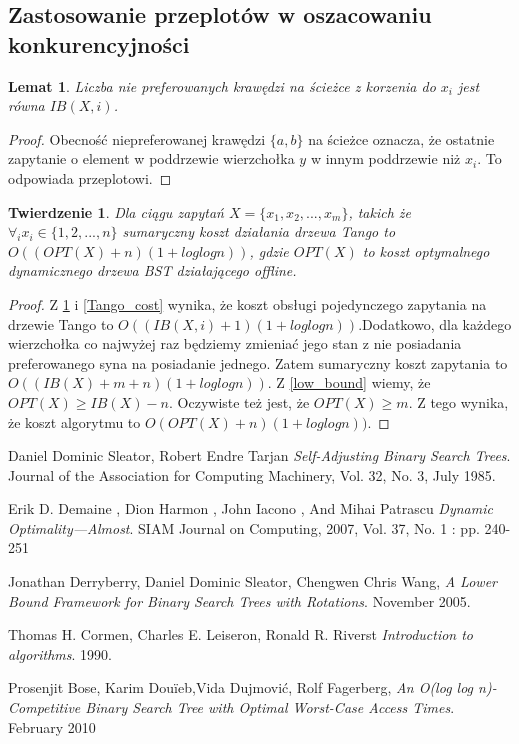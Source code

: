 \documentclass[declaration,shortabstract]{iithesis}
\theoremstyle{remark}
\theoremstyle{plain}
\newtheorem{theorem}[definition]{Twierdzenie}
\theoremstyle{plain}
\theoremstyle{plain}
\newtheorem{lemma}[definition]{Lemat}
\begin{document}
\subsection{Zastosowanie przeplotów w oszacowaniu konkurencyjności}
\begin{lemma}\label{num_switch}
Liczba nie preferowanych krawędzi na ścieżce z korzenia do \(x_i\) jest równa \(IB(X, i)\).
\end{lemma}
\begin{proof}
Obecność niepreferowanej krawędzi \( \{a, b\}\) na ścieżce oznacza, że ostatnie zapytanie o element w poddrzewie wierzchołka $y$ w innym poddrzewie niż \(x_i\). To odpowiada przeplotowi.
\end{proof}

\begin{theorem}
Dla ciągu zapytań \(X = \{x_1, x_2,..., x_m\}\), takich że \( \forall_i x_i \in \{1, 2, ..., n\}\) sumaryczny koszt działania drzewa Tango to \( O((OPT(X) + n)(1 + loglogn))\), gdzie \(OPT(X)\) to koszt optymalnego dynamicznego drzewa BST działającego offline. 
\end{theorem}
\begin{proof}
Z \ref{num_switch} i \ref{Tango_cost} wynika, że koszt obsługi pojedynczego zapytania na drzewie Tango to \(O((IB(X, i)+1)(1+loglogn))\).Dodatkowo, dla każdego wierzchołka co najwyżej raz będziemy zmieniać jego stan z nie posiadania preferowanego syna na posiadanie jednego. Zatem sumaryczny koszt zapytania to \(O((IB(X)+m +n )(1+loglogn))\). Z \ref{low_bound} wiemy, że \(OPT(X) \geq IB(X) - n\). Oczywiste też jest, że \(OPT(X) \geq m\). Z tego wynika, że koszt algorytmu to \(O(OPT(X)+n )(1+loglogn))\).
\end{proof}


\begin{thebibliography}{9}
  Daniel Dominic Sleator,
  Robert Endre Tarjan 
  \emph{Self-Adjusting Binary Search Trees}.
  Journal of the Association for Computing Machinery, Vol. 32, No. 3, July 1985. 
  
 Erik D. Demaine
, Dion Harmon
, John Iacono
, And Mihai Patrascu
  \emph{Dynamic Optimality—Almost}.
  SIAM Journal on Computing, 2007, Vol. 37, No. 1 : pp. 240-251 
  
  Jonathan Derryberry,
  Daniel Dominic Sleator,
  Chengwen Chris Wang,
  \emph{A Lower Bound Framework for Binary Search Trees with Rotations}.
  November 2005.
  
  Thomas H. Cormen,
  Charles E. Leiseron,
  Ronald R. Riverst
  \emph{Introduction to algorithms}.
  1990.
  
  Prosenjit Bose, 
  Karim Douïeb,Vida Dujmović,
  Rolf Fagerberg,
  \emph{An O(log log n)-Competitive Binary Search Tree with Optimal Worst-Case Access Times}.
  February 2010
  
  
  


\end{thebibliography}
\end{document}
